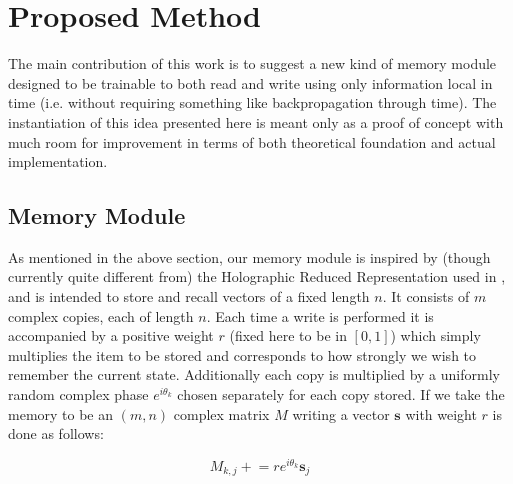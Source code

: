 \documentclass{article}
\begin{document}
\section*{Proposed Method}
The main contribution of this work is to suggest a new kind of memory module designed to be trainable to both read and write using only information local in time (i.e. without requiring something like backpropagation through time). The instantiation of this idea presented here is meant only as a proof of concept with much room for improvement in terms of both theoretical foundation and actual implementation.
\subsection*{Memory Module}
As mentioned in the above section, our memory module is inspired by (though currently quite different from) the Holographic Reduced Representation used in \cite{LSTM}, and is intended to store and recall vectors of a fixed length $n$. It consists of $m$ complex copies, each of length $n$. Each time a write is performed it is accompanied by a positive weight $r$ (fixed here to be in $[0,1]$) which simply multiplies the item to be stored and corresponds to how strongly we wish to remember the current state. Additionally each copy is multiplied by a uniformly random complex phase $e^{i\theta_k}$ chosen separately for each copy stored. If we take the memory to be an $(m,n)$ complex matrix $M$ writing a vector $\pmb{s}$ with weight $r$ is done as follows:

$$M_{k,j}\mathrel{+}=re^{i\theta_k}\pmb{s}_j$$
\end{document}

